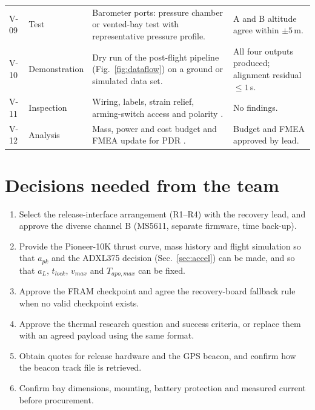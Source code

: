 \begin{longtable}{@{}L{11mm}L{23mm}L{70mm}L{42mm}@{}}
V-09 & Test & Barometer ports: pressure chamber or vented-bay test with representative pressure profile. & A and B altitude agree within $\pm5$\,m.\\
V-10 & Demonstration & Dry run of the post-flight pipeline (Fig.~\ref{fig:dataflow}) on a ground or simulated data set. & All four outputs produced; alignment residual $\le1$\,s.\\
V-11 & Inspection & Wiring, labels, strain relief, arming-switch access and polarity \cite{rtc2027app03}. & No findings.\\
V-12 & Analysis & Mass, power and cost budget and FMEA update for PDR \cite{rtc2027app12}. & Budget and FMEA approved by lead.\\
\end{longtable}
\normalsize

\section{Decisions needed from the team}
\begin{enumerate}
\item Select the release-interface arrangement (R1--R4) with the recovery lead, and approve the diverse channel B (MS5611, separate firmware, time back-up).
\item Provide the Pioneer-10K thrust curve, mass history and flight simulation so that $a_{pk}$ and the ADXL375 decision (Sec.~\ref{sec:accel}) can be made, and so that $a_L$, $t_{lock}$, $v_{max}$ and $T_{apo,max}$ can be fixed.
\item Approve the FRAM checkpoint and agree the recovery-board fallback rule when no valid checkpoint exists.
\item Approve the thermal research question and success criteria, or replace them with an agreed payload using the same format.
\item Obtain quotes for release hardware and the GPS beacon, and confirm how the beacon track file is retrieved.
\item Confirm bay dimensions, mounting, battery protection and measured current before procurement.
\end{enumerate}

\printbibliography[title={References}]
